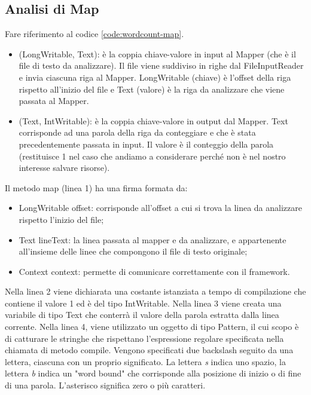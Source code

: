 \documentclass[italian,10pt,a4paper]{report}
\begin{document}
		\subsection{Analisi di Map}
		Fare riferimento al codice \ref{code:wordcount-map}.
		
		\begin{itemize}
			\item (LongWritable, Text): è la coppia chiave-valore in input al Mapper (che è il file di testo da analizzare). Il file viene suddiviso in righe dal FileInputReader e invia ciascuna riga al Mapper. LongWritable (chiave) è l'offset della riga rispetto all'inizio del file e Text (valore) è la riga da analizzare che viene passata al Mapper.
			\item (Text, IntWritable): è la coppia chiave-valore in output dal Mapper. Text corrisponde ad una parola della riga da conteggiare e che è stata precedentemente passata in input. Il valore è il conteggio della parola (restituisce 1 nel caso che andiamo a considerare perché non è nel nostro interesse salvare risorse).
		\end{itemize}
		
		Il metodo map (linea 1) ha una firma formata da:
		\begin{itemize}
			\item LongWritable offset: corrisponde all'offset a cui si trova la linea da analizzare rispetto l'inizio del file;
			\item Text lineText: la linea passata al mapper e da analizzare, e appartenente all'insieme delle linee che compongono il file di testo originale;
			\item Context context: permette di comunicare correttamente con il framework.
		\end{itemize}
		Nella linea 2 viene dichiarata una costante istanziata a tempo di compilazione che contiene il valore 1 ed è del tipo IntWritable.
		Nella linea 3 viene creata una variabile di tipo Text che conterrà il valore della parola estratta dalla linea corrente. Nella linea 4, viene utilizzato un oggetto di tipo Pattern, il cui scopo è di catturare le stringhe che rispettano l'espressione regolare specificata nella chiamata di metodo compile. Vengono specificati due backslash seguito da una lettera, ciascuna con un proprio significato. La lettera \textit{s} indica uno spazio, la lettera \textit{b} indica un "word bound" che corrisponde alla posizione di inizio o di fine di una parola. L'asterisco significa zero o più caratteri.
		
\end{document}
